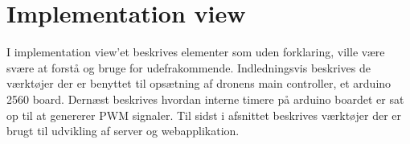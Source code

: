\section{Implementation view}

I implementation view'et beskrives elementer som uden forklaring, ville være svære at forstå og bruge for udefrakommende. Indledningsvis beskrives de værktøjer der er benyttet til opsætning af dronens main controller, et arduino 2560 board. Dernæst beskrives hvordan interne timere på arduino boardet er sat op til at genererer PWM signaler. Til sidst i afsnittet beskrives værktøjer der er brugt til udvikling af server og webapplikation.  



\newpage


\newpage


\newpage
